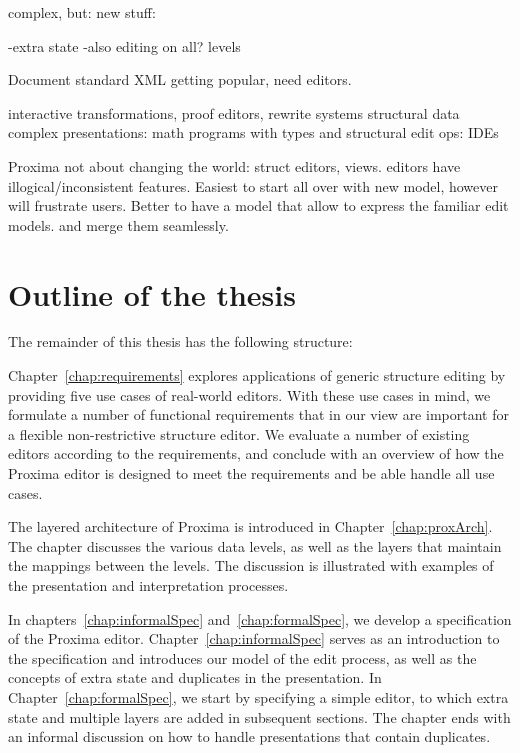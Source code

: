 %

\bc
complex, but:
new stuff:

-extra state
-also editing on all? levels

Document standard XML getting popular, need editors.

interactive transformations, proof editors, rewrite systems
structural data complex presentations: math
programs with types and structural edit ops: IDEs

Proxima not about changing the world: struct editors, views.  editors have illogical/inconsistent features. Easiest to start all over with new model, however will frustrate users. Better to have a model that allow to express the familiar edit models. and merge them seamlessly.
\ec


\section{Outline of the thesis}\label{sect:overview}

The remainder of this thesis has the following structure:

Chapter~\ref{chap:requirements} explores applications of generic structure editing by providing five use cases of real-world editors. With these use cases in mind, we formulate a number of functional requirements that in our view are important for a flexible non-restrictive structure editor. We evaluate a number of existing editors according to the requirements, and conclude with an overview of how the Proxima editor is designed to meet the requirements and be able handle all use cases.

The layered architecture of Proxima is introduced in Chapter~\ref{chap:proxArch}.  The chapter discusses the various data levels, as well as the layers that maintain the mappings between the levels. The discussion is illustrated with examples of the presentation and interpretation processes.

In chapters~\ref{chap:informalSpec} and~\ref{chap:formalSpec}, we develop a specification of the Proxima editor. Chapter~\ref{chap:informalSpec} serves as an introduction to the specification and introduces our model of the edit process, as well as the concepts of extra state and duplicates in the presentation. In  Chapter~\ref{chap:formalSpec}, we start by specifying a simple editor, to which extra state and multiple layers are added in subsequent sections. The chapter ends with an informal discussion on how to handle presentations that contain duplicates.


